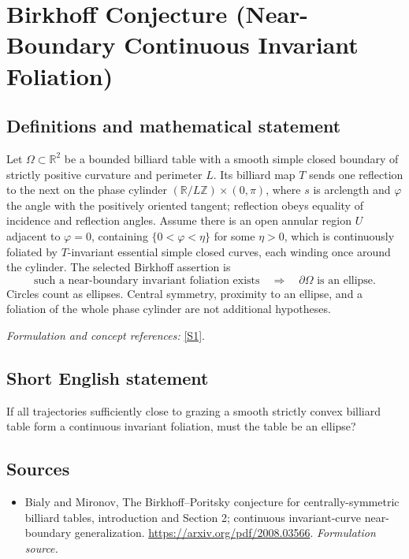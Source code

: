 \documentclass[11pt]{article}
\begin{document}
\section*{\texorpdfstring{Birkhoff Conjecture (Near-Boundary Continuous Invariant Foliation)}{Birkhoff Conjecture (Near-Boundary Continuous Invariant Foliation)}}\label{30006849}
\subsection{Definitions and mathematical statement}
Let $\Omega\subset{\mathbb{R}}^2$ be a bounded billiard table with a smooth simple closed boundary of strictly positive curvature and perimeter $L$. Its billiard map $T$ sends one reflection to the next on the phase cylinder $({\mathbb{R}}/L{\mathbb{Z}})\times(0,\pi)$, where $s$ is arclength and $\varphi$ the angle with the positively oriented tangent; reflection obeys equality of incidence and reflection angles. Assume there is an open annular region $U$ adjacent to $\varphi=0$, containing $\{0<\varphi<\eta\}$ for some $\eta>0$, which is continuously foliated by $T$-invariant essential simple closed curves, each winding once around the cylinder. The selected Birkhoff assertion is
\[
 \text{such a near-boundary invariant foliation exists}
 \quad\Longrightarrow\quad\partial\Omega\text{ is an ellipse}.
\]
Circles count as ellipses. Central symmetry, proximity to an ellipse, and a foliation of the whole phase cylinder are not additional hypotheses.
\par\smallskip\textit{Formulation and concept references:} \href{https://arxiv.org/pdf/2008.03566}{[S1]}.

\subsection{Short English statement}
If all trajectories sufficiently close to grazing a smooth strictly convex billiard table form a continuous invariant foliation, must the table be an ellipse?
\subsection{Sources}
\begin{itemize}
\item[S1]Bialy and Mironov, The Birkhoff–Poritsky conjecture for centrally-symmetric billiard tables, introduction and Section 2; continuous invariant-curve near-boundary generalization.
\url{https://arxiv.org/pdf/2008.03566}.
\textit{Formulation source.}
\end{itemize}
\end{document}
